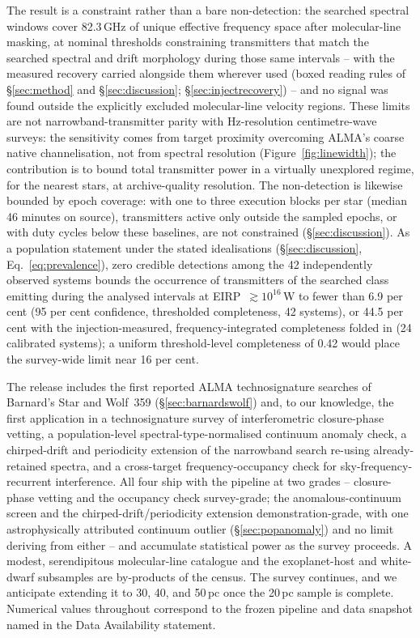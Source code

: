 \documentclass{openjournal}
\begin{document}
The result is a constraint rather than a bare non-detection: the
searched spectral windows cover 82.3\,GHz of unique effective
frequency space after molecular-line masking, at nominal thresholds
constraining transmitters that match the searched spectral and drift
morphology during those same intervals -- with the measured recovery
carried alongside them wherever used (boxed reading rules of
\S\ref{sec:method} and \S\ref{sec:discussion};
\S\ref{sec:injectrecovery}) -- and no signal was found outside the
explicitly excluded molecular-line velocity regions. These limits are
not narrowband-transmitter parity with Hz-resolution centimetre-wave
surveys: the sensitivity comes from target proximity overcoming
ALMA's coarse native channelisation, not from spectral resolution
(Figure~\ref{fig:linewidth}); the contribution is to bound total
transmitter power in a virtually unexplored regime, for the nearest
stars, at archive-quality resolution. The non-detection is likewise
bounded by epoch coverage: with one to three execution blocks per
star (median 46 minutes on source), transmitters active only outside
the sampled epochs, or with duty cycles below these baselines, are
not constrained (\S\ref{sec:discussion}). As a population statement
under the stated idealisations (\S\ref{sec:discussion},
Eq.~\ref{eq:prevalence}), zero credible detections among the 42
independently observed systems bounds the occurrence of transmitters
of the searched class emitting during the analysed intervals at
EIRP~$\gtrsim10^{16}$\,W to fewer than 6.9 per cent (95 per cent
confidence, thresholded completeness, 42 systems), or 44.5 per cent
with the injection-measured, frequency-integrated completeness folded
in (24 calibrated systems); a uniform threshold-level completeness of
0.42 would place the survey-wide limit near 16 per cent.

The release includes the first reported ALMA technosignature searches
of Barnard's Star and Wolf~359 (\S\ref{sec:barnardswolf}) and, to our
knowledge, the first application in a technosignature survey of
interferometric closure-phase vetting, a population-level
spectral-type-normalised continuum anomaly check, a chirped-drift and
periodicity extension of the narrowband search re-using
already-retained spectra, and a
cross-target frequency-occupancy check for sky-frequency-recurrent
interference. All four ship with the pipeline at two grades --
closure-phase vetting and the occupancy check survey-grade; the
anomalous-continuum screen and the chirped-drift/periodicity
extension demonstration-grade, with one astrophysically attributed
continuum outlier (\S\ref{sec:popanomaly}) and no limit deriving from
either -- and accumulate statistical power as the survey proceeds. A
modest, serendipitous molecular-line catalogue and the exoplanet-host
and white-dwarf subsamples are by-products of the census. The survey
continues, and we anticipate extending it to 30, 40, and 50\,pc once
the 20\,pc sample is complete. Numerical values throughout correspond
to the frozen pipeline and data snapshot named in the Data
Availability statement.
\end{document}
